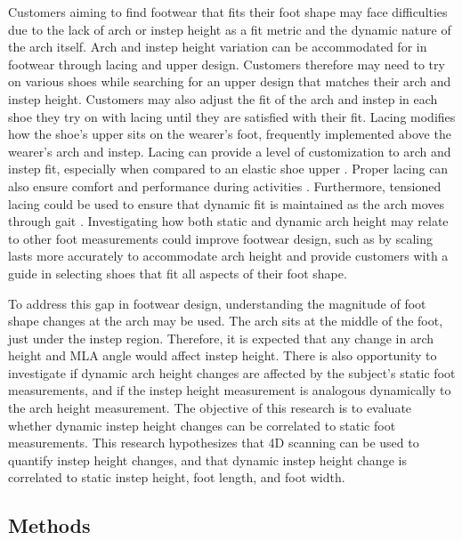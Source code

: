 \documentclass[defaultstyle,11pt]{thesis}
\begin{document}
Customers aiming to find footwear that fits their foot shape may face difficulties due to the lack of arch or instep height as a fit metric and the dynamic nature of the arch itself.
Arch and instep height variation can be accommodated for in footwear through lacing and upper design.
Customers therefore may need to try on various shoes while searching for an upper design that matches their arch and instep height.
Customers may also adjust the fit of the arch and instep in each shoe they try on with lacing until they are satisfied with their fit.
Lacing modifies how the shoe's upper sits on the wearer's foot, frequently implemented above the wearer's arch and instep.
Lacing can provide a level of customization to arch and instep fit, especially when compared to an elastic shoe upper \citep{Hong2011}.
Proper lacing can also ensure comfort and performance during activities \citep{Hagen2009, Hagen2010, Pryhoda2021}.
Furthermore, tensioned lacing could be used to ensure that dynamic fit is maintained as the arch moves through gait \citep{Pryhoda2021}.
Investigating how both static and dynamic arch height may relate to other foot measurements could improve footwear design, such as by scaling lasts more accurately to accommodate arch height and provide customers with a guide in selecting shoes that fit all aspects of their foot shape.

To address this gap in footwear design, understanding the magnitude of foot shape changes at the arch may be used.
The arch sits at the middle of the foot, just under the instep region.
Therefore, it is expected that any change in arch height and MLA angle would affect instep height.
There is also opportunity to investigate if dynamic arch height changes are affected by the subject's static foot measurements, and if the instep height measurement is analogous dynamically to the arch height measurement.
The objective of this research is to evaluate whether dynamic instep height changes can be correlated to static foot measurements.
This research hypothesizes that 4D scanning can be used to quantify instep height changes, and that dynamic instep height change is correlated to static instep height, foot length, and foot width.

\hypertarget{methods-2}{%
\subsection{Methods}\label{methods-2}}
\end{document}
